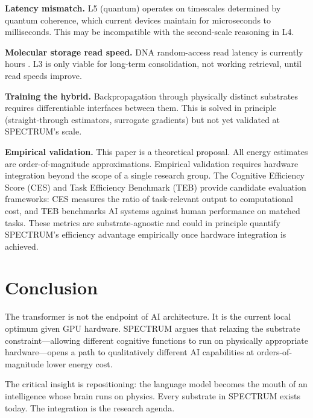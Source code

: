\documentclass[12pt]{article}
\begin{document}
\textbf{Latency mismatch.} L5 (quantum) operates on timescales determined by quantum coherence, which current devices maintain for microseconds to milliseconds. This may be incompatible with the second-scale reasoning in L4.

\textbf{Molecular storage read speed.} DNA random-access read latency is currently hours \cite{organick2018}. L3 is only viable for long-term consolidation, not working retrieval, until read speeds improve.

\textbf{Training the hybrid.} Backpropagation through physically distinct substrates requires differentiable interfaces between them. This is solved in principle (straight-through estimators, surrogate gradients) but not yet validated at SPECTRUM's scale.

\textbf{Empirical validation.} This paper is a theoretical proposal. All energy estimates are order-of-magnitude approximations. Empirical validation requires hardware integration beyond the scope of a single research group. The Cognitive Efficiency Score (CES) \cite{lin2026ces} and Task Efficiency Benchmark (TEB) \cite{lin2026teb} provide candidate evaluation frameworks: CES measures the ratio of task-relevant output to computational cost, and TEB benchmarks AI systems against human performance on matched tasks. These metrics are substrate-agnostic and could in principle quantify SPECTRUM's efficiency advantage empirically once hardware integration is achieved.

\section{Conclusion}

The transformer is not the endpoint of AI architecture. It is the current local optimum given GPU hardware. SPECTRUM argues that relaxing the substrate constraint---allowing different cognitive functions to run on physically appropriate hardware---opens a path to qualitatively different AI capabilities at orders-of-magnitude lower energy cost.

The critical insight is repositioning: the language model becomes the mouth of an intelligence whose brain runs on physics. Every substrate in SPECTRUM exists today. The integration is the research agenda.
\end{document}
